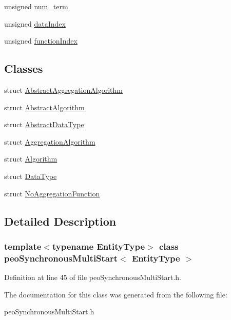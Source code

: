 \begin{CompactItemize}
\item 
\hypertarget{classpeoSynchronousMultiStart_e8c889e6228535ce02086c76d3480cbb}{
unsigned \hyperlink{classpeoSynchronousMultiStart_e8c889e6228535ce02086c76d3480cbb}{num\_\-term}}
\label{classpeoSynchronousMultiStart_e8c889e6228535ce02086c76d3480cbb}

\item 
\hypertarget{classpeoSynchronousMultiStart_a49cb2d76e6fdbfdbe0788c8388d6a0f}{
unsigned \hyperlink{classpeoSynchronousMultiStart_a49cb2d76e6fdbfdbe0788c8388d6a0f}{data\-Index}}
\label{classpeoSynchronousMultiStart_a49cb2d76e6fdbfdbe0788c8388d6a0f}

\item 
\hypertarget{classpeoSynchronousMultiStart_20cff9a01fb7bb621264b901dab7f336}{
unsigned \hyperlink{classpeoSynchronousMultiStart_20cff9a01fb7bb621264b901dab7f336}{function\-Index}}
\label{classpeoSynchronousMultiStart_20cff9a01fb7bb621264b901dab7f336}

\end{CompactItemize}
\subsection*{Classes}
\begin{CompactItemize}
\item 
struct \hyperlink{structpeoSynchronousMultiStart_1_1AbstractAggregationAlgorithm}{Abstract\-Aggregation\-Algorithm}
\item 
struct \hyperlink{structpeoSynchronousMultiStart_1_1AbstractAlgorithm}{Abstract\-Algorithm}
\item 
struct \hyperlink{structpeoSynchronousMultiStart_1_1AbstractDataType}{Abstract\-Data\-Type}
\item 
struct \hyperlink{structpeoSynchronousMultiStart_1_1AggregationAlgorithm}{Aggregation\-Algorithm}
\item 
struct \hyperlink{structpeoSynchronousMultiStart_1_1Algorithm}{Algorithm}
\item 
struct \hyperlink{structpeoSynchronousMultiStart_1_1DataType}{Data\-Type}
\item 
struct \hyperlink{structpeoSynchronousMultiStart_1_1NoAggregationFunction}{No\-Aggregation\-Function}
\end{CompactItemize}


\subsection{Detailed Description}
\subsubsection*{template$<$typename Entity\-Type$>$ class peo\-Synchronous\-Multi\-Start$<$ Entity\-Type $>$}





Definition at line 45 of file peo\-Synchronous\-Multi\-Start.h.

The documentation for this class was generated from the following file:\begin{CompactItemize}
\item 
peo\-Synchronous\-Multi\-Start.h\end{CompactItemize}

